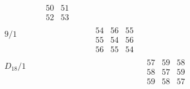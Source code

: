 \documentclass[12pt,a4paper]{amsart}
\begin{document}
\begin{align*}
\begin{array}{r||c|c|c|c|c|c}
&&
\begin{array}{r|r}%
50&51\\ \hline
52&53
\end{array}%
&& \\ \hline
    \begin{array}{r}
9/1\\ \\ \\
    \end{array}
    &&&&&
\begin{array}{rrr}
54&56&55\\
55&54&56\\
56&55&54
\end{array}%
& \\ \hline
    \begin{array}{r}
D_{18}/1\\ \\ \\
    \end{array}
    &&&&&&
\begin{array}{rrr}
57&59&58\\
58&57&59\\
59&58&57
\end{array}
  \end{array}
\end{align*}
\end{document}

